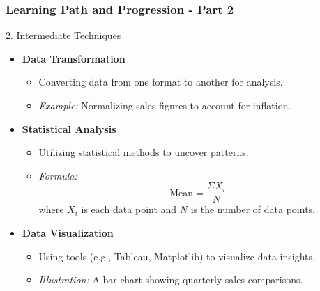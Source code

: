 \documentclass[aspectratio=169]{beamer}
\begin{document}
\begin{frame}[fragile]
    \frametitle{Learning Path and Progression - Part 2}
    \begin{block}{2. Intermediate Techniques}
        \begin{itemize}
            \item \textbf{Data Transformation}
                \begin{itemize}
                    \item Converting data from one format to another for analysis.
                    \item \textit{Example:} Normalizing sales figures to account for inflation.
                \end{itemize}

            \item \textbf{Statistical Analysis}
                \begin{itemize}
                    \item Utilizing statistical methods to uncover patterns.
                    \item \textit{Formula:} 
                      \begin{equation}
                      \text{Mean} = \frac{\Sigma X_i}{N}
                      \end{equation}
                      where \(X_i\) is each data point and \(N\) is the number of data points.
                \end{itemize}

            \item \textbf{Data Visualization}
                \begin{itemize}
                    \item Using tools (e.g., Tableau, Matplotlib) to visualize data insights.
                    \item \textit{Illustration:} A bar chart showing quarterly sales comparisons.
                \end{itemize}
        \end{itemize}
    \end{block}
\end{frame}
\end{document}
